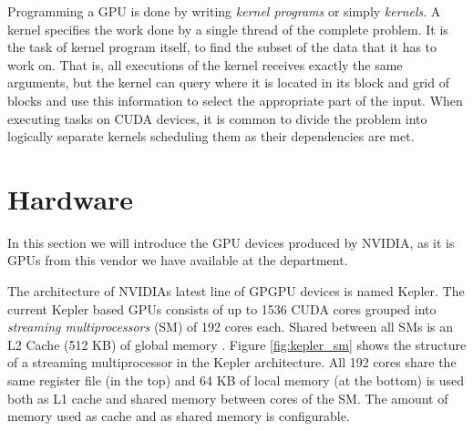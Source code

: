 Programming a GPU is done by writing \textit{kernel programs} or
simply \textit{kernels}. A kernel specifies the work done by a single
thread of the complete problem. It is the task of kernel program
itself, to find the subset of the data that it has to work on. That
is, all executions of the kernel receives exactly the same arguments,
but the kernel can query where it is located in its block and grid of
blocks and use this information to select the appropriate part of the
input. When executing tasks on CUDA devices, it is common to divide
the problem into logically separate kernels scheduling them as their
dependencies are met.



\section{Hardware}
\label{sec:gpu_hardware}
In this section we will introduce the GPU devices produced by NVIDIA,
as it is GPUs from this vendor we have available at the department.

The architecture of NVIDIAs latest line of GPGPU devices is named
Kepler. The current Kepler based GPUs consists of up to 1536 CUDA
cores grouped into \textit{streaming multiprocessors} (SM) of 192
cores each. Shared between all SMs is an L2 Cache (512 KB) of global
memory \cite{nvidia2012gtx680}. Figure \ref{fig:kepler_sm} shows the
structure of a streaming multiprocessor in the Kepler
architecture. All 192 cores share the same register file (in the top)
and 64 KB of local memory (at the bottom) is used both as L1 cache and
shared memory between cores of the SM. The amount of memory used as
cache and as shared memory is configurable.

